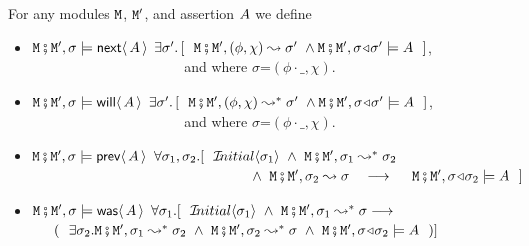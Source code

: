 \begin{definition}  \label{def:valid:assertion:time}
For any modules $\M$, $\M'$, and assertion  $\A$ we define

\begin{itemize}
 \item
  $\M\mkpair \M', \sigma \models  \Next \A $
  \IFF
  $\exists \sigma'.\, [\ \ \M\mkpair \M',(\phi, \chi) \leadsto  \sigma' \ \wedge \M\mkpair \M',\sigma\adapt\sigma' \models \A \ \  ]$,
 \\
$\strut ~ \hspace{1.4in} $ \hfill  and where $\sigma$=$(\phi\cdot\_,\chi)$.\item
  $\M\mkpair \M', \sigma \models  \Future \A $
  \IFF
  $\exists \sigma'.\, [\ \ \M\mkpair \M',(\phi, \chi) \leadsto^* \sigma' \ \wedge \M\mkpair \M',\sigma\adapt\sigma' \models \A \ \  ]$,
 \\
$\strut ~ \hspace{1.4in} $   \hfill   and where $\sigma$=$(\phi\cdot\_,\chi)$.  
  \item
 $\M\mkpair \M', \sigma \models  \Prev \A $ \IFF
 $\forall \sigma_1, \sigma_2. [\ \ \Initial{\sigma_1}\ \wedge \   \M\mkpair \M', \sigma_1  \leadsto^*  \sigma_2 $\\
 $\strut ~ \hspace{2.1in}   \wedge \   \M\mkpair \M', \sigma_2  \leadsto   \sigma  
 \ \  \ \longrightarrow \ \ \   \
 \M\mkpair \M', \sigma\adapt\sigma_2  \models \A\ \
 ]$ 
 \item
 $\M\mkpair \M', \sigma \models  \Past \A $ \IFF
%
$\forall \sigma_1. [\ \ \Initial{\sigma_1}\ \wedge \  \M\mkpair \M',\sigma_1 \leadsto^* \sigma \longrightarrow $\\
 $\strut ~ \hspace{0.1in} $   \hfill   $(\ \  \exists \sigma_2.
 \M\mkpair \M',\sigma_1 \leadsto^* \sigma_2 \ \wedge\  \M\mkpair \M',\sigma_2 \leadsto^* \sigma \ \wedge \ 
 \M\mkpair \M', \sigma\adapt\sigma_2  \models \A\ \ 
 )]$ 
\end{itemize}
\end{definition}
